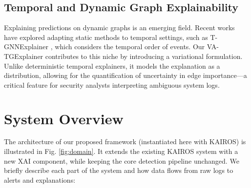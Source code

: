 \documentclass[conference]{IEEEtran}
\begin{document}
\subsection{Temporal and Dynamic Graph Explainability}
Explaining predictions on dynamic graphs is an emerging field. Recent works have explored adapting static methods to temporal settings, such as T-GNNExplainer \cite{b9}, which considers the temporal order of events. Our VA-TGExplainer contributes to this niche by introducing a variational formulation. Unlike deterministic temporal explainers, it models the explanation as a distribution, allowing for the quantification of uncertainty in edge importance—a critical feature for security analysts interpreting ambiguous system logs.

\section{System Overview}

The architecture of our proposed framework (instantiated here with KAIROS) is illustrated in Fig. \ref{fig:domain}. It extends the existing KAIROS system with a new XAI component, while keeping the core detection pipeline unchanged. We briefly describe each part of the system and how data flows from raw logs to alerts and explanations:
\end{document}
